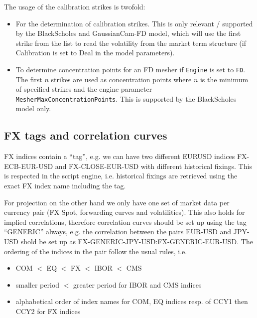 The usage of the calibration strikes is twofold:

\begin{itemize}
\item For the determination of calibration strikes. This is only relevant / supported by the BlackScholes and
  GaussianCam-FD model, which will use the first strike from the list to read the volatility from the market term
  structure (if Calibration is set to Deal in the model parameters).
\item To determine concentration points for an FD mesher if \verb+Engine+ is set to \verb+FD+. The first $n$ strikes are
  used as concentration points where $n$ is the minimum of specified strikes and the engine parameter
  \verb+MesherMaxConcentrationPoints+. This is supported by the BlackScholes model only.
\end{itemize}

\subsection{FX tags and correlation curves}\label{fxtags_correlationcurves}

FX indices contain a ``tag'', e.g. we can have two different EURUSD indices FX-ECB-EUR-USD and FX-CLOSE-EUR-USD with
different historical fixings. This is respected in the script engine, i.e. historical fixings are retrieved using the
exact FX index name including the tag.

For projection on the other hand we only have one set of market data per currency pair (FX Spot, forwarding curves and
volatilities). This also holds for implied correlations, therefore correlation curves should be set up using the tag
``GENERIC'' always, e.g. the correlation between the pairs EUR-USD and JPY-USD shold be set up as
FX-GENERIC-JPY-USD:FX-GENERIC-EUR-USD. The ordering of the indices in the pair follow the usual rules, i.e.

\begin{itemize}
\item COM $<$ EQ $<$ FX $<$ IBOR $<$ CMS
\item smaller period $<$ greater period for IBOR and CMS indices
\item alphabetical order of index names for COM, EQ indices resp. of CCY1 then CCY2 for FX indices
\end{itemize}
